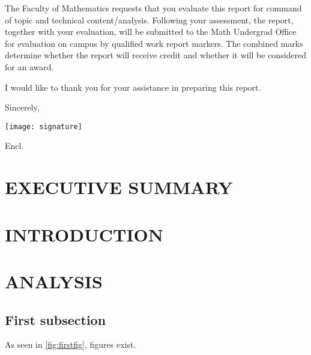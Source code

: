 \documentclass[titlepage, 12pt]{article}
\let\oldsection\section
\renewcommand\section[1]{\oldsection{\MakeUppercase{#1}}}
\begin{document}
\reportsummary{}

The Faculty of Mathematics requests that you evaluate this report for command
of topic and technical content/analysis. Following your assessment, the report,
together with your evaluation, will be submitted to the Math Undergrad Office
for evaluation on campus by qualified work report markers. The combined
marks determine whether the report will receive credit and whether it will
be considered for an award.

I would like to thank you for your assistance in preparing this report.

Sincerely,

\texttt{[image: signature]}

\student
\vfill
Encl.
\newpage
\renewcommand\contentsname{
    \begin{center}
        \normalsize \textbf{TABLE OF CONTENTS}
    \end{center}
}
\renewcommand\listfigurename{
    \begin{center}
        \normalsize \textbf{LIST OF FIGURES}
    \end{center}
}
\doublespacing
\tableofcontents
\listoffigures
\newpage
\setcounter{secnumdepth}{0}  %
\section{Executive Summary}

\lipsum

\newpage
\setcounter{secnumdepth}{3}
\section{Introduction}

\lipsum

\section{Analysis}

\subsection{First subsection}

\lipsum

As seen in \ref{fig:firstfig}, figures exist.
\end{document}
